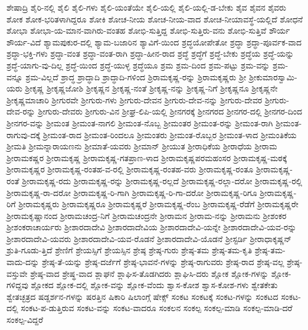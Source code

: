 {ಶೇಷಾದ್ರಿ
ಶೈರಿ-ನಲ್ಲಿ
ಶೈಲಿ
ಶೈಲಿ-ಗಳು
ಶೈಲಿ-ಯಂತೆಯೇ
ಶೈಲಿ-ಯಲ್ಲಿ
ಶೈಲಿ-ಯಲ್ಲಿ-ಡ-ಬೇಕು
ಶೈವ
ಶೈವನ
ಶೈವರು
ಶೋಕ
ಶೋಕ-ಭರಿತಳಾಗಿದ್ದರೂ
ಶೋಕಿ
ಶೋಚ-ನೀಯ
ಶೋಚ-ನೀಯ-ವಾದ
ಶೋಚ-ನೀಯಾವಸ್ಥೆ-ಯಲ್ಲಿದೆ
ಶೋಧನೆ
ಶೋಭಾ
ಶೋಭಾ-ಯ-ಮಾನ-ವಾಗಿರು-ವಂತಹ
ಶೋಭಿ-ಸುತ್ತಿದ್ದ
ಶೋಭಿ-ಸುತ್ತಿರು-ವನು
ಶೋಭಿ-ಸುತ್ತಿವೆ
ಶೌರ್ಯ
ಶೌರ್ಯ-ವಿದೆ
ಶ್ಯಾಮಪುಕುರ-ದಲ್ಲಿ
ಶ್ಯಾಮ-ಬಜಾರಿನ
ಶ್ಯಾವಿಗೆ-ಯಿಂದ
ಶ್ರದ್ಧಯೋಪೇತೋ
ಶ್ರದ್ಧಾ
ಶ್ರದ್ಧಾ-ಪೂರ್ವಕ-ವಾದ
ಶ್ರದ್ಧಾ-ಭಕ್ತಿ-ಗಳು
ಶ್ರದ್ಧಾ-ವಂತ
ಶ್ರದ್ಧಾ-ವಂತ-ರಾಗಿ
ಶ್ರದ್ಧಾ-ಹೀನ-ರಾದ
ಶ್ರದ್ಧೆ
ಶ್ರದ್ಧೆಗೆ
ಶ್ರದ್ಧೆ-ಬೇಕು
ಶ್ರದ್ಧೆಯ
ಶ್ರದ್ಧೆ-ಯನ್ನು
ಶ್ರದ್ಧೆ-ಯಾಗು-ವು-ದಿಲ್ಲ
ಶ್ರದ್ಧೆ-ಯಿಂದ
ಶ್ರದ್ಧೆ-ಯುಳ್ಳ
ಶ್ರದ್ಧೆಯೂ
ಶ್ರಮ
ಶ್ರಮ-ದಿಂದ
ಶ್ರಮ-ಪಟ್ಟು
ಶ್ರಮ-ವನ್ನು
ಶ್ರಮ-ವನ್ನೂ
ಶ್ರಮ-ವಿಲ್ಲದೆ
ಶ್ರಾದ್ಧ
ಶ್ರಾದ್ಧಾದಿ
ಶ್ರಾದ್ಧಾದಿ-ಗಳಿಂದ
ಶ್ರಿರಾಮಕೃಷ್ಣ-ರನ್ನು
ಶ್ರಿರಾಮಕೃಷ್ಣರು
ಶ್ರೀ
ಶ್ರೀಕುಮಾರಸ್ವಾಮಿ-ಯರು
ಶ್ರೀಕೃಷ್ಣ
ಶ್ರೀಕೃಷ್ಣಜೋಶಿ
ಶ್ರೀಕೃಷ್ಣನ
ಶ್ರೀಕೃಷ್ಣ-ನಂತೆ
ಶ್ರೀಕೃಷ್ಣ-ನನ್ನು
ಶ್ರೀಕೃಷ್ಣ-ನಿಗೆ
ಶ್ರೀಕೃಷ್ಣನೂ
ಶ್ರೀಕೃಷ್ಣನೇ
ಶ್ರೀಕೃಷ್ಣಮಾಚಾರಿ
ಶ್ರೀಗುರವೇ
ಶ್ರೀಗುರು-ಗಳು
ಶ್ರೀಗುರು-ದೇವನ
ಶ್ರೀಗುರು-ದೇವ-ನನ್ನು
ಶ್ರೀಗುರು-ದೇವರ
ಶ್ರೀಗುರು-ದೇವ-ರನ್ನು
ಶ್ರೀಗುರು-ದೇವರು
ಶ್ರೀಗುರು-ವಿನ
ಶ್ರೀಘ್ರ-ಲಿಪಿ-ಯಲ್ಲಿ
ಶ್ರೀನಗರಕ್ಕೆ
ಶ್ರೀನಗರದ
ಶ್ರೀನಗರ-ದಲ್ಲಿ
ಶ್ರೀನಗರ-ದಿಂದ
ಶ್ರೀನಗರ-ವನ್ನು
ಶ್ರೀಮಂತ
ಶ್ರೀಮಂತ-ನಾಗಲಿ
ಶ್ರೀಮಂತ-ನೊಬ್ಬ
ಶ್ರೀಮಂತರ
ಶ್ರೀಮಂತ-ರನ್ನು
ಶ್ರೀಮಂತ-ರಾಗಿ
ಶ್ರೀಮಂತ-ರಾಗುವು-ದಕ್ಕೆ
ಶ್ರೀಮಂತ-ರಾದ
ಶ್ರೀಮಂತ-ರಿಂದಲೂ
ಶ್ರೀಮಂತರು
ಶ್ರೀಮಂತ-ರೊಬ್ಬರ
ಶ್ರೀಮಂತ-ಳಾದ
ಶ್ರೀಮಂತಿಕೆಯ
ಶ್ರೀಮತಿ
ಶ್ರೀಮನ್ನಾರಾಯಣನು
ಶ್ರೀಮಾತೆ-ಯವರು
ಶ್ರೀಮಾನ್
ಶ್ರೀಯುತ
ಶ್ರೀರಾಧಿಕೆಯ
ಶ್ರೀರಾಧೆಯ
ಶ್ರೀರಾಮ
ಶ್ರೀರಾಮಕಷ್ಣರ
ಶ್ರೀರಾಮಕೃಷ್ಣ
ಶ್ರೀರಾಮಕೃಷ್ಣ-ಗತಪ್ರಾಣ-ಳಾದ
ಶ್ರೀರಾಮಕೃಷ್ಣಪರಮಹಂಸರ
ಶ್ರೀರಾಮಕೃಷ್ಣ-ಮಠಕ್ಕೆ
ಶ್ರೀರಾಮಕೃಷ್ಣರ
ಶ್ರೀರಾಮಕೃಷ್ಣ-ರಂತಹ-ವ-ರಲ್ಲಿ
ಶ್ರೀರಾಮಕೃಷ್ಣ-ರಂತಹ-ವರು
ಶ್ರೀರಾಮಕೃಷ್ಣ-ರಂತೂ
ಶ್ರೀರಾಮಕೃಷ್ಣ-ರಂತೆ
ಶ್ರೀರಾಮಕೃಷ್ಣ-ರದು
ಶ್ರೀರಾಮಕೃಷ್ಣ-ರನ್ನು
ಶ್ರೀರಾಮಕೃಷ್ಣ-ರಲ್ಲದೆ
ಶ್ರೀರಾಮಕೃಷ್ಣ-ರಲ್ಲಾ-ದರೋ
ಶ್ರೀರಾಮಕೃಷ್ಣ-ರಲ್ಲಿ
ಶ್ರೀರಾಮಕೃಷ್ಣ-ರಾ-ದರೋ
ಶ್ರೀರಾಮಕೃಷ್ಣ-ರಿ-ಗಾಗಿ
ಶ್ರೀರಾಮಕೃಷ್ಣ-ರಿ-ಗಾ-ದರೋ
ಶ್ರೀರಾಮಕೃಷ್ಣ-ರಿಗೂ
ಶ್ರೀರಾಮಕೃಷ್ಣ-ರಿಗೆ
ಶ್ರೀರಾಮಕೃಷ್ಣರು
ಶ್ರೀರಾಮಕೃಷ್ಣರೂ
ಶ್ರೀರಾಮಕೃಷ್ಣರೆ
ಶ್ರೀರಾಮಕೃಷ್ಣ-ರೆಂಬ
ಶ್ರೀರಾಮಕೃಷ್ಣ-ರೆಡೆಗೆ
ಶ್ರೀರಾಮಕೃಷ್ಣರೇ
ಶ್ರೀರಾಮಕೃಷ್ಣಾನಂದ
ಶ್ರೀರಾಮಚಂದ್ರ-ನಿಗೆ
ಶ್ರೀರಾಮಚಂದ್ರನೇ
ಶ್ರೀರಾಮನ
ಶ್ರೀರಾಮ-ನನ್ನು
ಶ್ರೀರಾಮನು
ಶ್ರೀಶಂಕರ
ಶ್ರೀಶಂಕರಾಚಾರ್ಯರು
ಶ್ರೀಶಾರದಾದೇವಿ
ಶ್ರೀಶಾರದಾದೇವಿಯ
ಶ್ರೀಶಾರದಾದೇವಿ-ಯನ್ನೇ
ಶ್ರೀಶಾರದಾದೇವಿ-ಯವ-ರನ್ನು
ಶ್ರೀಶಾರದಾದೇವಿ-ಯವರು
ಶ್ರೀಶಾರದಾದೇವಿ-ಯವ-ರೊಡನೆ
ಶ್ರೀಶಾರದಾದೇವಿ-ಯೊಡನೆ
ಶ್ರೀಸ್ಟರ್ಡಿ
ಶ್ರೀರಾಧಾಕೃಷ್ಣನ್
ಶ್ರುತಿ-ಗೂಡು-ತ್ತಿದೆ
ಶ್ರೇಣಿಗೆ
ಶ್ರೇಯಸ್ಸಿಗೆ
ಶ್ರೇಯಸ್ಸಿನ
ಶ್ರೇಷ್ಠ
ಶ್ರೇಷ್ಠ-ಗುರು
ಶ್ರೇಷ್ಠ-ತಮ
ಶ್ರೇಷ್ಠ-ತಮ-ಕೃತಿ
ಶ್ರೇಷ್ಠ-ತಮ-ವಾದು-ದನ್ನು
ಶ್ರೇಷ್ಠ-ತೆ-ಯನ್ನು
ಶ್ರೇಷ್ಠ-ದರ್ಜೆಗೆ
ಶ್ರೇಷ್ಠ-ಭಾವನೆ-ಗಳನ್ನು
ಶ್ರೇಷ್ಠ-ರಾಗುವರು
ಶ್ರೇಷ್ಠ-ರಾದ
ಶ್ರೇಷ್ಠ-ವಲ್ಲ
ಶ್ರೇಷ್ಠ-ವಸ್ತುವೇ
ಶ್ರೇಷ್ಠ-ವಾದ
ಶ್ರೇಷ್ಥ-ವಾದ
ಶ್ಲಾಘನೆ
ಶ್ಲಾಘಿಸ-ತೊಡಗಿದರು
ಶ್ಲಾಘಿಸಿ-ದರು
ಶ್ಲೋಕ
ಶ್ಲೋಕ-ಗಳನ್ನು
ಶ್ಲೋಕ-ಗಳಿದ್ದವು
ಶ್ಲೋಕದ
ಶ್ಲೋಕ-ದಲ್ಲಿ
ಶ್ಲೋಕ-ವನ್ನು
ಶ್ಲೋಕ-ವೆಂದು
ಶ್ವಾಸ-ಕೋಶ
ಶ್ವಾಸ-ಕೋಶ-ಗಳು
ಶ್ವೇತಕೇತು
ಶ್ವೇತಚ್ಛತ್ರದ
ಷಡ್ದರ್ಶನ-ಗಳನ್ನು
ಷರತ್ತಿನ
ಷಿಕಾರಿ
ಷಿಲಾಂಗ್ಗೆ
ಷೇಕ್ಸ್
ಸಂಕಟ
ಸಂಕಟಕ್ಕೆ
ಸಂಕಟ-ಗಳನ್ನು
ಸಂಕಟದ
ಸಂಕಟ-ದಲ್ಲಿ
ಸಂಕಟ-ಪ-ಡುತ್ತಿರುವ
ಸಂಕಟ-ವನ್ನು
ಸಂಕಟ-ವಾದರೂ
ಸಂಕಲನ
ಸಂಕಲ್ಪ
ಸಂಕಲ್ಪ-ಮಾಡಿ
ಸಂಕಲ್ಪ-ಮಾಡಿ-ದರೆ
ಸಂಕಲ್ಪ-ವಿದ್ದರೆ
}
